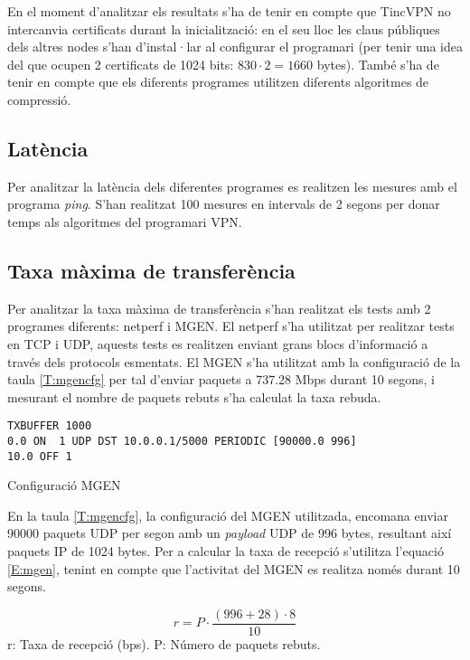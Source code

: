 En el moment d'analitzar els resultats s'ha de tenir en compte que TincVPN no intercanvia certificats durant la inicialització: en el seu lloc les claus públiques dels altres nodes s'han d'instal·lar al configurar el programari (per tenir una idea del que ocupen 2 certificats de 1024 bits: $830\cdot2=1660$ bytes).
També s'ha de tenir en compte que els diferents programes utilitzen diferents algoritmes de compressió. 

\subsection{Latència}
Per analitzar la latència dels diferentes programes es realitzen les mesures amb el programa \emph{ping}. S'han realitzat 100 mesures en intervals de 2 segons per donar temps als algoritmes del programari VPN.

\subsection{Taxa màxima de transferència}
Per analitzar la taxa màxima de transferència s'han realitzat els tests amb 2 programes diferents: netperf i MGEN.
El netperf s'ha utilitzat per realitzar tests en TCP i UDP, aquests tests es realitzen enviant grans blocs d'informació a través dels protocols esmentats.
El MGEN s'ha utilitzat amb la configuració de la taula \ref{T:mgencfg} per tal d'enviar paquets a 737.28 Mbps durant 10 segons, i mesurant el nombre de paquets rebuts s'ha calculat la taxa rebuda.
\begin{table}[htb]
\begin{center}
\begin{minipage}[htb]{0.6\linewidth}
\footnotesize
\begin{verbatim}
TXBUFFER 1000
0.0 ON  1 UDP DST 10.0.0.1/5000 PERIODIC [90000.0 996]
10.0 OFF 1
\end{verbatim}
\end{minipage}
\caption{Configuració MGEN}
\label{T:mgencfg}
\end{center}
\end{table}

En la taula \ref{T:mgencfg}, la configuració del MGEN utilitzada, encomana enviar 90000 paquets UDP per segon amb un \emph{payload} UDP de 996 bytes, resultant així paquets IP de 1024 bytes. Per a calcular la taxa de recepció s'utilitza l'equació \ref{E:mgen}, tenint en compte que l'activitat del MGEN es realitza només durant 10 segons.

\begin{minipage}[htb]{\linewidth}
\begin{equation}\label{E:mgen}
r=P\cdot\frac{(996+28)\cdot8}{10}
\end{equation}
\centering
{\scriptsize
r: Taxa de recepció (bps). 
P: Número de paquets rebuts. 
}\\
\vspace{1em}
\end{minipage}

